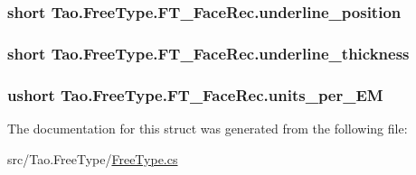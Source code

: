 \hypertarget{struct_tao_1_1_free_type_1_1_f_t___face_rec_a8d21f666484ad093a6a682a5b4d8610f}{
\subsubsection[{underline\_\-position}]{\setlength{\rightskip}{0pt plus 5cm}short {\bf Tao.FreeType.FT\_\-FaceRec.underline\_\-position}}}
\label{struct_tao_1_1_free_type_1_1_f_t___face_rec_a8d21f666484ad093a6a682a5b4d8610f}
\hypertarget{struct_tao_1_1_free_type_1_1_f_t___face_rec_aad5b5431d1523ad602e4c7f01b179aee}{
\subsubsection[{underline\_\-thickness}]{\setlength{\rightskip}{0pt plus 5cm}short {\bf Tao.FreeType.FT\_\-FaceRec.underline\_\-thickness}}}
\label{struct_tao_1_1_free_type_1_1_f_t___face_rec_aad5b5431d1523ad602e4c7f01b179aee}
\hypertarget{struct_tao_1_1_free_type_1_1_f_t___face_rec_a641631e81c6b6db9e6f625d56249765b}{
\subsubsection[{units\_\-per\_\-EM}]{\setlength{\rightskip}{0pt plus 5cm}ushort {\bf Tao.FreeType.FT\_\-FaceRec.units\_\-per\_\-EM}}}
\label{struct_tao_1_1_free_type_1_1_f_t___face_rec_a641631e81c6b6db9e6f625d56249765b}


The documentation for this struct was generated from the following file:\begin{DoxyCompactItemize}
\item 
src/Tao.FreeType/\hyperlink{_free_type_8cs}{FreeType.cs}\end{DoxyCompactItemize}
